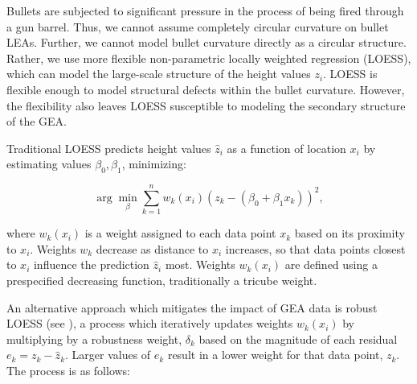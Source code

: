 \documentclass[12pt]{article}
\begin{document}
Bullets are subjected to significant pressure in the process of being
fired through a gun barrel. Thus, we cannot assume completely circular
curvature on bullet LEAs. Further, we cannot model bullet curvature
directly as a circular structure. Rather, we use more flexible
non-parametric locally weighted regression (LOESS), which can model the
large-scale structure of the height values \(z_i\). LOESS is flexible
enough to model structural defects within the bullet curvature. However,
the flexibility also leaves LOESS susceptible to modeling the secondary
structure of the GEA.

Traditional LOESS predicts height values \(\widehat{z}_i\) as a function
of location \(x_i\) by estimating values \(\beta_0, \beta_1\),
minimizing:

\[ \arg\min_{\beta} \sum_{k=1}^n w_k(x_i) (z_k - (\beta_0 + \beta_1x_k))^2,\]

where \(w_k(x_i)\) is a weight assigned to each data point \(x_k\) based
on its proximity to \(x_i\). Weights \(w_k\) decrease as distance to
\(x_i\) increases, so that data points closest to \(x_i\) influence the
prediction \(\widehat{z}_i\) most. Weights \(w_k(x_i)\) are defined
using a prespecified decreasing function, traditionally a tricube
weight.
{}
{\color{purple}{Finish explanation of how method is applied before switching to robust LOESS? how does it end? Similar to my comment on page 7 bottom.}}

An alternative approach which mitigates the impact of GEA data is robust
LOESS (see \cite{Cleveland1}), a process which iteratively updates
weights \(w_k(x_i)\) by multiplying by a robustness weight, \(\delta_k\)
based on the magnitude of each residual \(e_k = z_k - \widehat{z}_k\).
Larger values of \(e_k\) result in a lower weight for that data point,
\(z_k\). The process is as follows:
\end{document}
